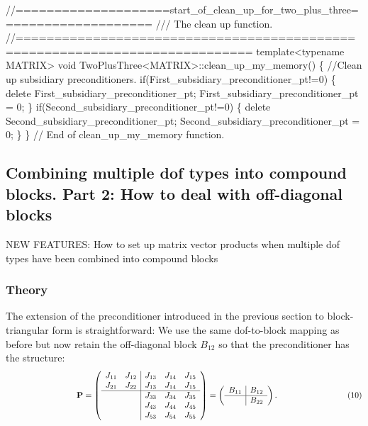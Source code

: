 \begin{DoxyCodeInclude}
 \textcolor{comment}{//====================start\_of\_clean\_up\_for\_two\_plus\_three====================}\textcolor{comment}{}
\textcolor{comment}{ /// The clean up function.}
\textcolor{comment}{} \textcolor{comment}{//============================================================================}
 \textcolor{keyword}{template}<\textcolor{keyword}{typename} MATRIX> 
 \textcolor{keywordtype}{void} TwoPlusThree<MATRIX>::clean\_up\_my\_memory()
 \{     
  \textcolor{comment}{//Clean up subsidiary preconditioners.}
  \textcolor{keywordflow}{if}(First\_subsidiary\_preconditioner\_pt!=0)
   \{
    \textcolor{keyword}{delete} First\_subsidiary\_preconditioner\_pt;
    First\_subsidiary\_preconditioner\_pt = 0;
   \}
  \textcolor{keywordflow}{if}(Second\_subsidiary\_preconditioner\_pt!=0)
   \{
    \textcolor{keyword}{delete} Second\_subsidiary\_preconditioner\_pt;
    Second\_subsidiary\_preconditioner\_pt = 0;
   \}
 \} \textcolor{comment}{// End of clean\_up\_my\_memory function.}

\end{DoxyCodeInclude}




 

\hypertarget{index_two_plus_three_upper_triangular}{}\subsection{Combining multiple dof types into compound blocks. Part 2\+: How to deal with off-\/diagonal blocks}\label{index_two_plus_three_upper_triangular}
N\+EW F\+E\+A\+T\+U\+R\+ES\+: How to set up matrix vector products when multiple dof types have been combined into compound blocks\hypertarget{index_two_plus_three_upper_triangular_theory}{}\subsubsection{Theory}\label{index_two_plus_three_upper_triangular_theory}
The extension of the preconditioner introduced in the previous section to block-\/triangular form is straightforward\+: We use the same dof-\/to-\/block mapping as before but now retain the off-\/diagonal block $ B_{12} $ so that the preconditioner has the structure\+: \[ \hspace{3cm} {\bf P} = \left( \begin{array}{cc|ccc} J_{11} & J_{12} & J_{13} & J_{14} & J_{15} \\ J_{21} & J_{22} & J_{13} & J_{14} & J_{15} \\ \hline & & J_{33} & J_{34} & J_{35} \\ & & J_{43} & J_{44} & J_{45} \\ & & J_{53} & J_{54} & J_{55} \\ \end{array} \right) = \left( \begin{array}{c|c} B_{11} & B_{12}\\ \hline & B_{22} \\ \end{array} \right). \hspace{3cm} (10) \]

